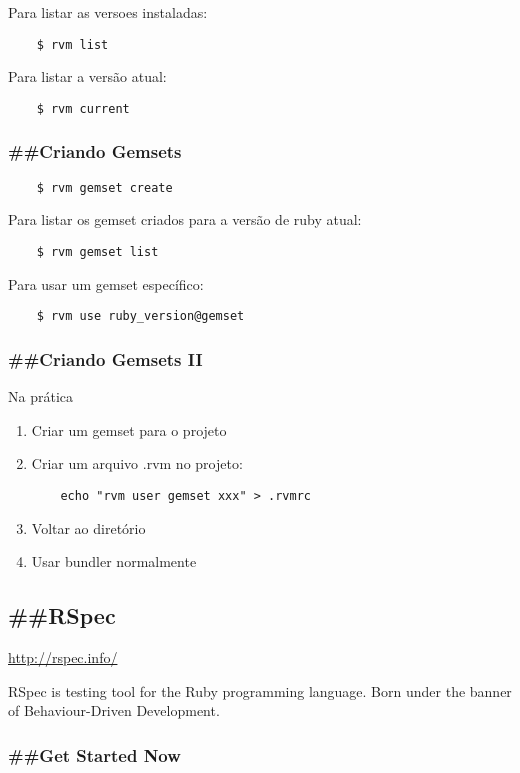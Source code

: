 \documentclass[serif,mathserif]{article}
\begin{document}
Para listar as versoes instaladas:
\begin{verbatim}
    $ rvm list
\end{verbatim}

Para listar a versão atual:
\begin{verbatim}
    $ rvm current
\end{verbatim}


\subsubsection{\#\#Criando Gemsets}

\begin{verbatim}
    $ rvm gemset create
\end{verbatim}

Para listar os gemset criados para a versão de ruby atual:
\begin{verbatim}
    $ rvm gemset list
\end{verbatim}

Para usar um gemset específico:
\begin{verbatim}
    $ rvm use ruby_version@gemset
\end{verbatim}

\subsubsection{\#\#Criando Gemsets II}
Na prática

\begin{enumerate}
  \item Criar um gemset para o projeto
  \item Criar um arquivo .rvm no projeto:
\begin{verbatim}
    echo "rvm user gemset xxx" > .rvmrc
\end{verbatim}
 \item Voltar ao diretório
 \item Usar bundler normalmente
\end{enumerate}

\subsection{\#\#RSpec}

\url{http://rspec.info/}

RSpec is testing tool for the Ruby programming language. Born under the banner of Behaviour-Driven Development.

\subsubsection{\#\#Get Started Now}
\end{document}
